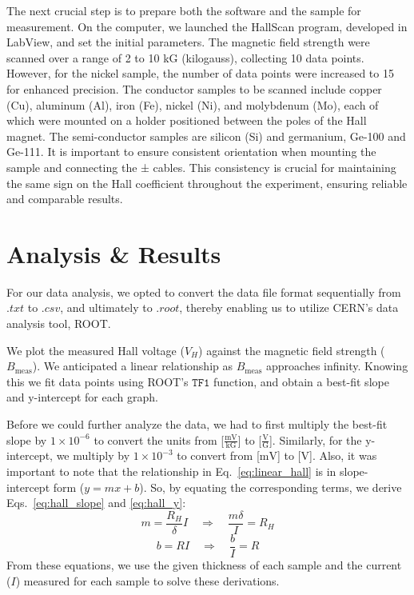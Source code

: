 \documentclass[a4paper,12pt,english]{all-in-one} %
\begin{document}
\begin{multicols}{2}
{The next crucial step is to prepare both the software and the sample for measurement. On the computer, we launched the HallScan program, developed in LabView, and set the initial parameters. The magnetic field strength were scanned over a range of 2 to 10 kG (kilogauss), collecting 10 data points. However, for the nickel sample, the number of data points were increased to 15 for enhanced precision. The conductor samples to be scanned include copper (Cu), aluminum (Al), iron (Fe), nickel (Ni), and molybdenum (Mo), each of which were mounted on a holder positioned between the poles of the Hall magnet. The semi-conductor samples are silicon (Si) and germanium, Ge-100 and Ge-111. It is important to ensure consistent orientation when mounting the sample and connecting the ± cables. This consistency is crucial for maintaining the same sign on the Hall coefficient throughout the experiment, ensuring reliable and comparable results.
}

\section*{Analysis \& Results}
{
For our data analysis, we opted to convert the data file format sequentially from $.txt$ to $.csv$, and ultimately to $.root$, thereby enabling us to utilize CERN's data analysis tool, ROOT.

We plot the measured Hall voltage ($V_{H}$) against the magnetic field strength ($B_{\text{meas}}$). We anticipated a linear relationship as $B_{\text{meas}}$ approaches infinity. Knowing this we fit data points using ROOT's $\texttt{TF1}$ function, and obtain a best-fit slope and y-intercept for each graph.

Before we could further analyze the data, we had to first multiply the best-fit slope by $1 \times 10^{-6}$ to convert the units from [$\frac{\text{mV}}{\text{kG}}$] to [$\frac{\text{V}}{\text{G}}$]. Similarly, for the y-intercept, we multiply by $1 \times 10^{-3}$ to convert from [$\text{mV}$] to [$\text{V}$]. Also, it was important to note that the relationship in Eq.~\eqref{eq:linear_hall} is in slope-intercept form ($y = mx + b$). So, by equating the corresponding terms, we derive Eqs.~\eqref{eq:hall_slope} and \eqref{eq:hall_y}:
\begin{equation}\label{eq:hall_slope}
m = \frac{R_H}{\delta}I \quad \Rightarrow \quad \frac{m\delta}{I}  = R_H
\end{equation}
\begin{equation}\label{eq:hall_y}
b = RI \quad \Rightarrow \quad \frac{b}{I} = R
\end{equation}
From these equations, we use the given thickness of each sample and the current ($I$) measured for each sample to solve these derivations.

}
\end{multicols}
\end{document}
